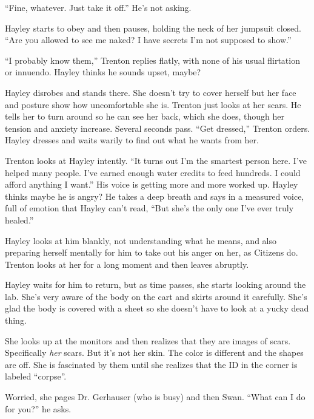 ``Fine, whatever.  Just take it off.''  He's not asking.

Hayley starts to obey and then pauses, holding the neck of her jumpsuit closed.  ``Are you allowed to see me naked?  I have secrets I'm not supposed to show.'' 

``I probably know them,'' Trenton replies flatly, with none of his usual flirtation or innuendo.  Hayley thinks he sounds upset, maybe?

Hayley disrobes and stands there.  She doesn't try to cover herself but her face and posture show how uncomfortable she is.  Trenton just looks at her scars.  He tells her to turn around so he can see her back, which she does, though her tension and anxiety increase.  Several seconds pass.  ``Get dressed,'' Trenton orders.  Hayley dresses and waits warily to find out what he wants from her.



Trenton looks at Hayley intently.  ``It turns out I'm the smartest person here.  I've helped many people.  I've earned enough water credits to feed hundreds.  I could afford anything I want.''  His voice is getting more and more worked up.  Hayley thinks maybe he is angry?  He takes a deep breath and says in a measured voice, full of emotion that Hayley can't read, ``But she's the only one I've ever truly healed.''



Hayley looks at him blankly, not understanding what he means, and also preparing herself mentally for him to take out his anger on her, as Citizens do.  Trenton looks at her for a long moment and then leaves abruptly.



Hayley waits for him to return, but as time passes, she starts looking around the lab.  She's very aware of the body on the cart and skirts around it carefully.   She's glad the body is covered with a sheet so she doesn't have to look at a yucky dead thing.



She looks up at the monitors and then realizes that they are images of scars.  Specifically \textit{her} scars.  But it's not her skin.  The color is different and the shapes are off.  She is fascinated by them until she realizes that the ID in the corner is labeled ``corpse''.



Worried, she pages Dr. Gerhauser (who is busy) and then Swan.  ``What can I do for you?'' he asks.

